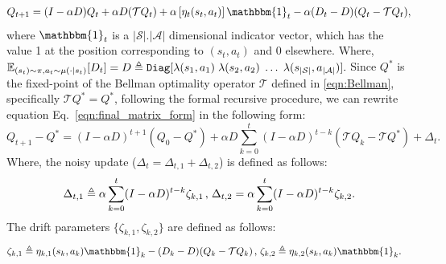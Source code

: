 \documentclass{article}
\begin{document}
\begin{equation} \label{eqn:final_matrix_form}
    Q_{t+1} = (I - \alpha D) Q_t + \alpha D (\mathcal{T}Q_t) + \alpha \left[\eta_t(s_t, a_t)\right] \mathbbm{1}_t - \alpha (D_t - D)(Q_t - \mathcal{T}Q_t),
\end{equation}
where \(\mathbbm{1}_{t}\) is a $\lvert\mathcal{S}\rvert.\lvert\mathcal{A}\rvert$ dimensional indicator vector, which has the value 1 at the position corresponding to \((s_t, a_t)\) and 0 elsewhere. Where, \(\mathbb{E}_{(s_t) \sim \pi, a_t \sim \mu(\cdot \lvert s_t)}[D_t] = D \triangleq \texttt{Diag}[\lambda(s_1,a_1)\hspace{1 mm}\lambda(s_2,a_2)\hspace{1 mm}\hdots\hspace{1 mm}\lambda(s_{|\mathcal{S}|},a_{|\mathcal{A}|})].\) Since \(Q^{*}\) is the fixed-point of the Bellman optimality operator \( \mathcal{T} \) defined in \eqref{eqn:Bellman}, specifically \( \mathcal{T}Q^* = Q^* \), following the formal recursive procedure, we can rewrite equation Eq.~\eqref{eqn:final_matrix_form} in the following form: 
\begin{equation}\label{eqn:adversarial_final_recursion}
 Q_{t+1} - Q^* = (I - \alpha D)^{t+1} (Q_0 - Q^*) + \alpha D \sum_{k=0}^{t} (I - \alpha D)^{t-k} (\mathcal{T} Q_k - \mathcal{T} Q^*) + \Delta_t.
\end{equation}
Where, the noisy update ($\Delta_t = \Delta_{t,1} + \Delta_{t,2}$) is defined as follows:
\begin{equation}\label{eqn:drift_params_final}
    \Delta_{t,1} \triangleq \alpha \sum_{k=0}^{t} (I - \alpha D)^{t-k}\zeta_{k,1}\hspace{0.5mm},\hspace{0.5mm}\Delta_{t,2} = \alpha \sum_{k=0}^{t} (I - \alpha D)^{t-k} \zeta_{k,2}.
\end{equation}
The drift parameters \(\{\zeta_{k,1},\zeta_{k,2}\}\) are defined as follows:
\begin{equation}
\begin{aligned}\label{eqn:drift_params}
    &\zeta_{k,1} \triangleq \eta_{k,1}(s_k, a_k) \mathbbm{1}_k - (D_k - D)(Q_k - \mathcal{T}Q_k)\hspace{0.5mm},\hspace{0.5mm}\zeta_{k,2} \triangleq \eta_{k,2}(s_k, a_k) \mathbbm{1}_k.
\end{aligned}
\end{equation}
\fi 
\end{document}
